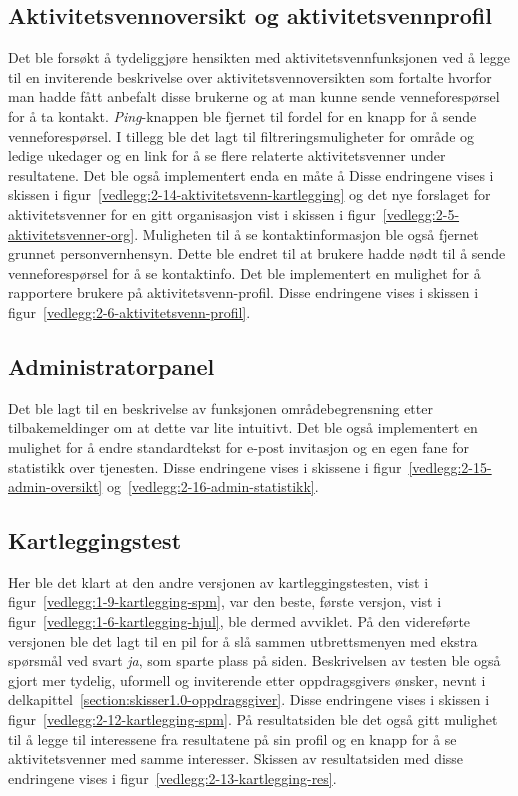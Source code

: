  
 \subsection{Aktivitetsvennoversikt og aktivitetsvennprofil}
 
 Det ble forsøkt å tydeliggjøre hensikten med aktivitetsvennfunksjonen ved å legge til en inviterende beskrivelse over aktivitetsvennoversikten som fortalte hvorfor man hadde fått anbefalt disse brukerne og at man kunne sende venneforespørsel for å ta kontakt. {\em Ping}-knappen ble fjernet til fordel for en knapp for å sende venneforespørsel. I tillegg ble det lagt til filtreringsmuligheter for område og ledige ukedager og en link for å se flere relaterte aktivitetsvenner under resultatene. Det ble også implementert enda en måte å  Disse endringene vises i skissen i figur~\ref{vedlegg:2-14-aktivitetsvenn-kartlegging} og det nye forslaget for aktivitetsvenner for en gitt organisasjon vist i skissen i figur~\ref{vedlegg:2-5-aktivitetsvenner-org}. Muligheten til å se kontaktinformasjon ble også fjernet grunnet personvernhensyn. Dette ble endret til at brukere hadde nødt til å sende venneforespørsel for å se kontaktinfo. Det ble implementert en mulighet for å rapportere brukere på aktivitetsvenn-profil. Disse endringene vises i skissen i figur~\ref{vedlegg:2-6-aktivitetsvenn-profil}.
 
 \subsection{Administratorpanel}
 Det ble lagt til en beskrivelse av funksjonen områdebegrensning etter tilbakemeldinger om at dette var lite intuitivt. Det ble også implementert en mulighet for å endre standardtekst for e-post invitasjon og en egen fane for statistikk over tjenesten. Disse endringene vises i skissene i figur~\ref{vedlegg:2-15-admin-oversikt} og~\ref{vedlegg:2-16-admin-statistikk}.
 
 \subsection{Kartleggingstest}
 
 Her ble det klart at den andre versjonen av kartleggingstesten, vist i figur~\ref{vedlegg:1-9-kartlegging-spm}, var den beste, første versjon, vist i figur~\ref{vedlegg:1-6-kartlegging-hjul}, ble dermed avviklet. På den videreførte versjonen ble det lagt til en pil for å slå sammen utbrettsmenyen med ekstra spørsmål ved svart {\em ja}, som sparte plass på siden. Beskrivelsen av testen ble også gjort mer tydelig, uformell og inviterende etter oppdragsgivers ønsker, nevnt i delkapittel~\ref{section:skisser1.0-oppdragsgiver}. Disse endringene vises i skissen i figur~\ref{vedlegg:2-12-kartlegging-spm}. På resultatsiden ble det også gitt mulighet til å legge til interessene fra resultatene på sin profil og en knapp for å se aktivitetsvenner med samme interesser. Skissen av resultatsiden med disse endringene vises i figur~\ref{vedlegg:2-13-kartlegging-res}.
 
